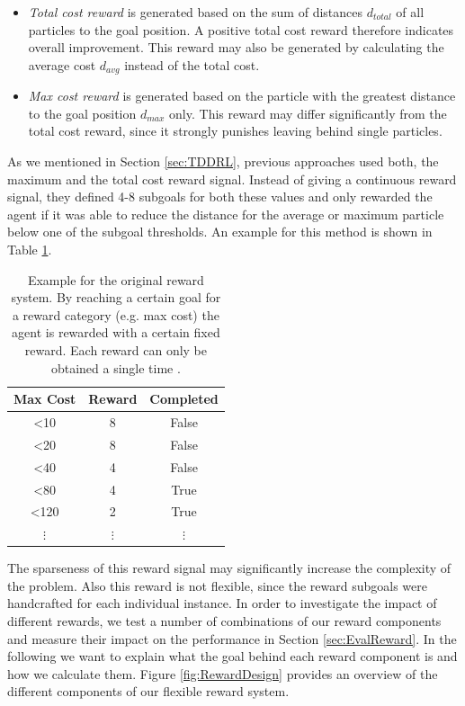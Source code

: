 \begin{itemize}
    \item \textit{Total cost reward} is generated based on the sum of distances $d_{total}$ of all particles to the goal position. A positive total cost reward therefore indicates overall improvement. This reward may also be generated by calculating the average cost $d_{avg}$ instead of the total cost.
    \item \textit{Max cost reward} is generated based on the particle with the greatest distance to the goal position $d_{max}$ only. This reward may differ significantly from the total cost reward, since it strongly punishes leaving behind single particles. 
\end{itemize}

As we mentioned in Section \ref{sec:TDDRL}, previous approaches used both, the maximum and the total cost reward signal. Instead of giving a continuous reward signal, they defined 4-8 subgoals for both these values and only rewarded the agent if it was able to reduce the distance for the average or maximum particle below one of the subgoal thresholds. An example for this method is shown in Table \ref{tab:OriginalRewards}.

\begin{table} [ht]
    \begin{center}
        \begin{tabular}{|c|c|c|}
            \hline
            Max Cost & Reward & Completed \\
            \hline
            <10 & 8 & False \\
            <20 & 8 & False \\
            <40 & 4 & False \\
            <80 & 4 & True \\
            <120 & 2 & True \\
            $\vdots$ & $\vdots$ & $\vdots$ \\
            \hline
        \end{tabular}
    \end{center}
    \caption[Original Reward Example]{Example for the original reward system. By reaching a certain goal for a reward category (e.g. max cost) the agent is rewarded with a certain fixed reward. Each reward can only be obtained a single time \cite{huang2019}.} \label{tab:OriginalRewards}
\end{table}


The sparseness of this reward signal may significantly increase the complexity of the problem. Also this reward is not flexible, since the reward subgoals were handcrafted for each individual instance. In order to investigate the impact of different rewards, we test a number of combinations of our reward components and measure their impact on the performance in Section \ref{sec:EvalReward}. In the following we want to explain what the goal behind each reward component is and how we calculate them. Figure \ref{fig:RewardDesign} provides an overview of the different components of our flexible reward system.

